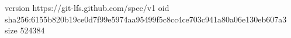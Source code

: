 version https://git-lfs.github.com/spec/v1
oid sha256:6155b820b19ce0d7f99e5974aa95499f5c8cc4ce703c941a80a06e130eb607a3
size 524384

